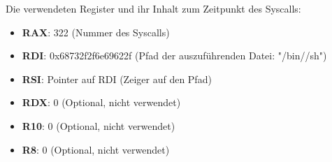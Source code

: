 Die verwendeten Register und ihr Inhalt zum Zeitpunkt des Syscalls:

\begin{itemize}
    \item \textbf{RAX}: 322 (Nummer des Syscalls)
    \item \textbf{RDI}: 0x68732f2f6e69622f (Pfad der auszuführenden Datei: "/bin//sh")
    \item \textbf{RSI}: Pointer auf RDI (Zeiger auf den Pfad)
    \item \textbf{RDX}: 0 (Optional, nicht verwendet)
    \item \textbf{R10}: 0 (Optional, nicht verwendet)
    \item \textbf{R8}:  0 (Optional, nicht verwendet)
\end{itemize}
